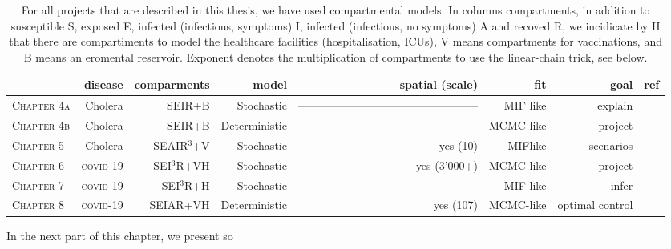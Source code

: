 \begin{table*}[t]
\label{tab:allmodels}
\centering
\begin{tabular}{lrrrrrrr}
\toprule
                    & disease           & comparments & model         & spatial (scale) & fit       & goal            & ref\\
\midrule
\textsc{Chapter 4a} & Cholera           & SEIR+B      & Stochastic    & ————————————————              & MIF like  & explain         & \parencite{Lemaitre:RainfallDriverEpidemic:2019}\\
\textsc{Chapter 4b} & Cholera           & SEIR+B      & Deterministic & ————————————————              & MCMC-like & project         & \parencite{Lemaitre:RainfallDriverEpidemic:2019}\\
\textsc{Chapter 5}  & Cholera           & SEAIR$^3$+V & Stochastic    & yes (10)        & MIFlike   & scenarios       & \parencite{Lee:AchievingCoordinatedNational:2020} \\ \addlinespace
\textsc{Chapter 6}  & \textsc{covid}-19 & SEI$^3$R+VH & Stochastic    & yes (3’000+)    & MCMC-like & project         & \parencite{Lemaitre:ScenarioModelingPipeline:2021} \\
\textsc{Chapter 7}  & \textsc{covid}-19  & SEI$^3$R+H  & Stochastic    & ————————————————              & MIF-like  & infer           & \parencite{Lemaitre:AssessingImpactNonpharmaceutical:2020}\\
\textsc{Chapter 8}  & \textsc{covid}-19  & SEIAR+VH    & Deterministic & yes (107)       & MCMC-like & optimal control & \parencite{Lemaitre:OptimizingSpatiotemporalAllocation:2021}\\ 
\bottomrule
\end{tabular}
\caption[Comparison of the different models presented in this thesis]{For all projects that are described in this thesis, we have used compartmental models. In columns compartments, in addition to susceptible S, exposed E, infected (infectious, symptoms) I, infected (infectious, no symptoms) A and recoved R, we incidicate by H that there are compartiments to model the healthcare facilities (hospitalisation, ICUs), V means compartments for vaccinations, and B means an eromental reservoir. Exponent denotes the multiplication of compartments to use the linear-chain trick, see below.}
\end{table*}

In the next part of this chapter, we present so

